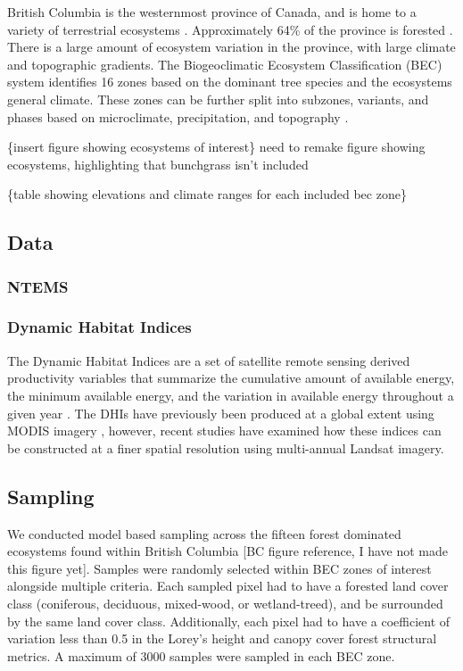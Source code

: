 \documentclass[
  authoryear,
  review,
  3p,
  twocolumn]{elsarticle}
\begin{document}
British Columbia is the westernmost province of Canada, and is home to a
variety of terrestrial ecosystems \citep{pojar1987}. Approximately 64\%
of the province is forested \citep{bcministryofforests2003}. There is a
large amount of ecosystem variation in the province, with large climate
and topographic gradients. The Biogeoclimatic Ecosystem Classification
(BEC) system identifies 16 zones based on the dominant tree species and
the ecosystems general climate. These zones can be further split into
subzones, variants, and phases based on microclimate, precipitation, and
topography \citep{pojar1987}.

\{insert figure showing ecosystems of interest\} need to remake figure
showing ecosystems, highlighting that bunchgrass isn't included

\{table showing elevations and climate ranges for each included bec
zone\}

\hypertarget{data}{%
\subsection{Data}\label{data}}

\hypertarget{ntems}{%
\subsubsection{NTEMS}\label{ntems}}

\hypertarget{dynamic-habitat-indices}{%
\subsubsection{Dynamic Habitat Indices}\label{dynamic-habitat-indices}}

The Dynamic Habitat Indices are a set of satellite remote sensing
derived productivity variables that summarize the cumulative amount of
available energy, the minimum available energy, and the variation in
available energy throughout a given year \citep{radeloff2019}. The DHIs
have previously been produced at a global extent using MODIS imagery
\citep{radeloff2019}, however, recent studies have examined how these
indices can be constructed at a finer spatial resolution using
multi-annual Landsat imagery.

\hypertarget{sampling}{%
\subsection{Sampling}\label{sampling}}

We conducted model based sampling across the fifteen forest dominated
ecosystems found within British Columbia {[}BC figure reference, I have
not made this figure yet{]}. Samples were randomly selected within BEC
zones of interest alongside multiple criteria. Each sampled pixel had to
have a forested land cover class (coniferous, deciduous, mixed-wood, or
wetland-treed), and be surrounded by the same land cover class.
Additionally, each pixel had to have a coefficient of variation less
than 0.5 in the Lorey's height and canopy cover forest structural
metrics. A maximum of 3000 samples were sampled in each BEC zone.
\end{document}
